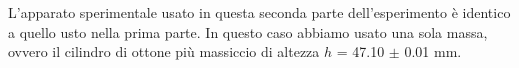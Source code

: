 L'apparato sperimentale usato in questa seconda parte dell'esperimento è
identico a quello usto nella prima parte. In questo caso abbiamo usato una sola massa,
ovvero il cilindro di ottone più massiccio di altezza $h$ = 47.10 $\pm$ 0.01 mm.
